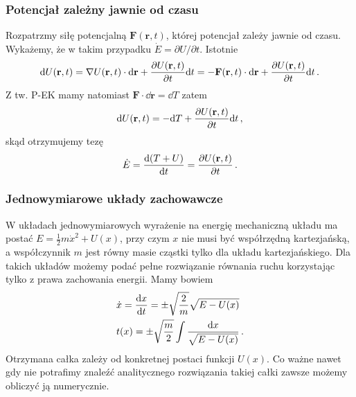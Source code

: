 \documentclass[../main.tex]{subfiles}
\begin{document}
\subsubsection*{Potencjał zależny jawnie od czasu}
Rozpatrzmy siłę potencjalną \(\mathbf{F}(\mathbf{r},t)\), której potencjał zależy jawnie od czasu.
Wykażemy, że w takim przypadku \(\dot E=\partial U/\partial t\). Istotnie
\begin{equation*}
    \dd U(\mathbf{r},t)=\nabla U(\mathbf{r},t)\cdot \dd\mathbf{r}+\pdv{U(\mathbf{r},t)}{t}\dd t=-\mathbf{F}(\mathbf{r},t)\cdot \dd\mathbf{r}+\pdv{U(\mathbf{r},t)}{t}\dd t\,.
\end{equation*}
Z tw. P-EK mamy natomiast \(\mathbf{F}\cdot \dd\mathbf{r}=\dd T\) zatem
\begin{equation*}
    \dd U(\mathbf{r},t)=-\dd T+\pdv{U(\mathbf{r},t)}{t}\dd t\,,
\end{equation*}
skąd otrzymujemy tezę
\begin{equation*}
    \dot{E}=\dv{(T+U)}{t}=\pdv{U(\mathbf{r},t)}{t}\,.
\end{equation*}
\subsubsection{Jednowymiarowe układy zachowawcze}
W układach jednowymiarowych wyrażenie na energię mechaniczną układu ma postać
\(E=\frac{1}{2}m\dot{x}^2+U(x)\), przy czym \(x\) nie musi być współrzędną kartezjańską, a
współczynnik \(m\) jest równy masie cząstki tylko dla układu kartezjańskiego. Dla takich układów
możemy podać pełne rozwiązanie równania  ruchu korzystając tylko z prawa zachowania energii. Mamy
bowiem
\begin{equation*}
\begin{split}
    &\dot x=\dv{x}{t}=\pm\sqrt{\frac{2}{m}}\sqrt{E-U(x)}\\
    &t(x)=\pm\sqrt{\frac{m}{2}}\int\frac{\dd x}{\sqrt{E-U(x)}}\,.
\end{split}
\end{equation*}
Otrzymana całka zależy od konkretnej postaci funkcji \(U(x)\). Co ważne nawet gdy nie potrafimy
znaleźć analitycznego rozwiązania takiej całki zawsze możemy obliczyć ją numerycznie.
\end{document}
